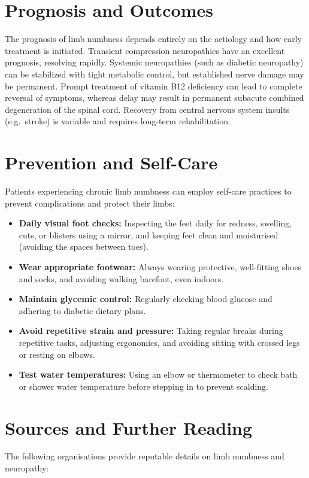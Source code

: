 \section*{Prognosis and Outcomes}
The prognosis of limb numbness depends entirely on the aetiology and how early treatment is initiated. Transient compression neuropathies have an excellent prognosis, resolving rapidly. Systemic neuropathies (such as diabetic neuropathy) can be stabilized with tight metabolic control, but established nerve damage may be permanent. Prompt treatment of vitamin B12 deficiency can lead to complete reversal of symptoms, whereas delay may result in permanent subacute combined degeneration of the spinal cord. Recovery from central nervous system insults (e.g.\ stroke) is variable and requires long-term rehabilitation.

\section*{Prevention and Self-Care}
Patients experiencing chronic limb numbness can employ self-care practices to prevent complications and protect their limbs:

\begin{itemize}
    \item \textbf{Daily visual foot checks:} Inspecting the feet daily for redness, swelling, cuts, or blisters using a mirror, and keeping feet clean and moisturised (avoiding the spaces between toes).
    \item \textbf{Wear appropriate footwear:} Always wearing protective, well-fitting shoes and socks, and avoiding walking barefoot, even indoors.
    \item \textbf{Maintain glycemic control:} Regularly checking blood glucose and adhering to diabetic dietary plans.
    \item \textbf{Avoid repetitive strain and pressure:} Taking regular breaks during repetitive tasks, adjusting ergonomics, and avoiding sitting with crossed legs or resting on elbows.
    \item \textbf{Test water temperatures:} Using an elbow or thermometer to check bath or shower water temperature before stepping in to prevent scalding.
\end{itemize}

\section*{Sources and Further Reading}
The following organisations provide reputable details on limb numbness and neuropathy:

